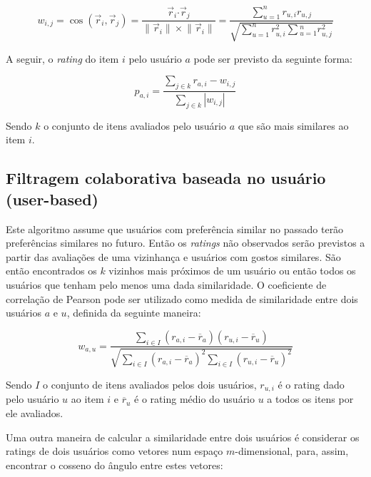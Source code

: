 \documentclass[12pt,a4paper,header]{abnt}
\begin{document}
\begin{equation}
w_{i, j} = \cos({\vec{r}_i, \vec{r}_j}) = \frac{\vec{r}_i \boldsymbol{\cdot} \vec{r}_j}{\lVert \vec{r}_i\rVert \times \lVert \vec{r}_i\rVert} = \frac{\sum_{u=1}^{n}{r_{u, i} r_{u, j}}}{\sqrt{\sum_{u=1}^{n}{r^2_{u, i}} \sum{_{u=1}^{n}{r^2_{u, j}}}}}
\end{equation}

A seguir, o \textit{rating} do item $i$ pelo usuário $a$ pode ser previsto da seguinte forma\cite{melville2011recommender}:

\begin{equation}
p_{a, i} = \frac{\sum_{j \in k}{r_{a, i} - w_{i, j}}}{\sum_{j \in k}{\left|w_{i, j}\right|}}
\end{equation}

Sendo $k$ o conjunto de itens avaliados pelo usuário $a$ que são mais similares ao item $i$.

\subsection{Filtragem colaborativa baseada no usuário (user-based)}

Este algoritmo assume que usuários com preferência similar no passado terão preferências similares no futuro. Então os \textit{ratings} não observados serão previstos a partir das avaliações de uma vizinhança e usuários com gostos similares\cite{hahsler2015recommenderlab}. São então encontrados os $k$ vizinhos mais próximos de um usuário ou então todos os usuários que tenham pelo menos uma dada similaridade. O coeficiente de correlação de Pearson pode ser utilizado como medida de similaridade entre dois usuários $a$ e $u$, definida da seguinte maneira\cite{melville2011recommender}:

\begin{equation}
w_{a, u} = \frac{\sum_{i \in I}{(r_{a, i} - \overline{r}_a ) ( r_{u, i} - \overline{r}_u )}}{\sqrt{\sum_{i \in I}{(r_{a, i} - \overline{r}_a )^2} \sum_{i \in I}{(r_{u, i} - \overline{r}_u )^2}}}
\end{equation}

Sendo $I$ o conjunto de itens avaliados pelos dois usuários, $r_{u, i}$ é o rating dado pelo usuário $u$ ao item $i$ e $\overline{r}_u$ é o rating médio do usuário $u$ a todos os itens por ele avaliados. 

Uma outra maneira de calcular a similaridade entre dois usuários é considerar os ratings de dois usuários como vetores num espaço $m$-dimensional, para, assim, encontrar o cosseno do ângulo entre estes vetores\cite{melville2011recommender}:
\end{document}
